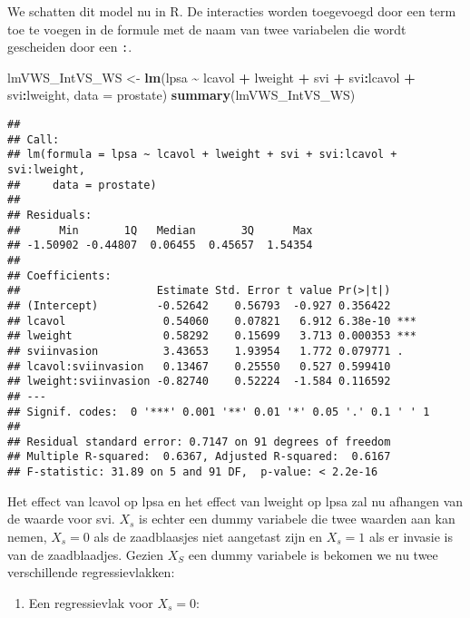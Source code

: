 \documentclass[
  12pt,dutch,coursenotes]{book}
\newenvironment{Shaded}{\begin{snugshade}}{\end{snugshade}}
\newcommand{\DataTypeTok}[1]{\textcolor[rgb]{0.13,0.29,0.53}{#1}}
\newcommand{\KeywordTok}[1]{\textcolor[rgb]{0.13,0.29,0.53}{\textbf{#1}}}
\newcommand{\NormalTok}[1]{#1}
\newcommand{\OperatorTok}[1]{\textcolor[rgb]{0.81,0.36,0.00}{\textbf{#1}}}
\newcommand{\StringTok}[1]{\textcolor[rgb]{0.31,0.60,0.02}{#1}}
\providecommand{\tightlist}{%
  \setlength{\itemsep}{0pt}\setlength{\parskip}{0pt}}
\theoremstyle{definition}
\theoremstyle{definition}
\theoremstyle{definition}
\theoremstyle{remark}
\begin{document}
We schatten dit model nu in R. De interacties worden toegevoegd door een term toe te voegen in de formule met de naam van twee variabelen die wordt gescheiden door een \texttt{:}.

\begin{Shaded}
\begin{Highlighting}[]
\NormalTok{lmVWS\_IntVS\_WS \textless{}{-}}\StringTok{ }\KeywordTok{lm}\NormalTok{(lpsa }\OperatorTok{\textasciitilde{}}\StringTok{ }\NormalTok{lcavol }\OperatorTok{+}\StringTok{ }\NormalTok{lweight }\OperatorTok{+}\StringTok{ }\NormalTok{svi }\OperatorTok{+}\StringTok{ }
\StringTok{    }\NormalTok{svi}\OperatorTok{:}\NormalTok{lcavol }\OperatorTok{+}\StringTok{ }\NormalTok{svi}\OperatorTok{:}\NormalTok{lweight, }\DataTypeTok{data =}\NormalTok{ prostate)}
\KeywordTok{summary}\NormalTok{(lmVWS\_IntVS\_WS)}
\end{Highlighting}
\end{Shaded}

\begin{verbatim}
## 
## Call:
## lm(formula = lpsa ~ lcavol + lweight + svi + svi:lcavol + svi:lweight, 
##     data = prostate)
## 
## Residuals:
##      Min       1Q   Median       3Q      Max 
## -1.50902 -0.44807  0.06455  0.45657  1.54354 
## 
## Coefficients:
##                     Estimate Std. Error t value Pr(>|t|)    
## (Intercept)         -0.52642    0.56793  -0.927 0.356422    
## lcavol               0.54060    0.07821   6.912 6.38e-10 ***
## lweight              0.58292    0.15699   3.713 0.000353 ***
## sviinvasion          3.43653    1.93954   1.772 0.079771 .  
## lcavol:sviinvasion   0.13467    0.25550   0.527 0.599410    
## lweight:sviinvasion -0.82740    0.52224  -1.584 0.116592    
## ---
## Signif. codes:  0 '***' 0.001 '**' 0.01 '*' 0.05 '.' 0.1 ' ' 1
## 
## Residual standard error: 0.7147 on 91 degrees of freedom
## Multiple R-squared:  0.6367, Adjusted R-squared:  0.6167 
## F-statistic: 31.89 on 5 and 91 DF,  p-value: < 2.2e-16
\end{verbatim}

Het effect van lcavol op lpsa en het effect van lweight op lpsa zal nu afhangen van de waarde voor svi.
\(X_s\) is echter een dummy variabele die twee waarden aan kan nemen, \(X_s=0\) als de zaadblaasjes niet aangetast zijn en \(X_s=1\) als er invasie is van de zaadblaadjes.
Gezien \(X_S\) een dummy variabele is bekomen we nu twee verschillende regressievlakken:

\begin{enumerate}
\def\labelenumi{\arabic{enumi}.}
\tightlist
\item
  Een regressievlak voor \(X_s=0\):
\end{enumerate}
\end{document}
